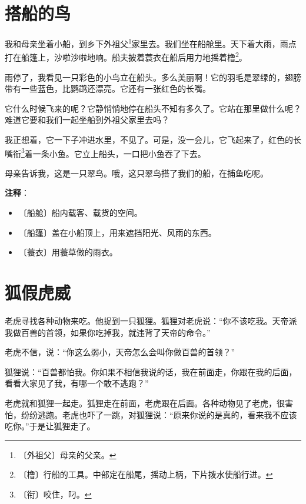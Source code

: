\documentclass[12pt,UTF-8,openany]{ctexbook}
\begin{document}
\chapter{搭船的鸟}

\begin{large}
    
    我和母亲坐着小船，到乡下外祖父\footnote{〔外祖父〕母亲的父亲。}家里去。我们坐在船舱里。天下着大雨，雨点打在船篷上，沙啦沙啦地响。船夫披着蓑衣在船后用力地摇着橹\footnote{〔橹〕行船的工具。中部定在船尾，摇动上柄，下片拨水使船行进。}。
    
    雨停了，我看见一只彩色的小鸟立在船头。多么美丽啊！它的羽毛是翠绿的，翅膀带有一些蓝色，比鹦鹉还漂亮。它还有一张红色的长嘴。
    
    它什么时候飞来的呢？它静悄悄地停在船头不知有多久了。它站在那里做什么呢？难道它要和我们一起坐船到外祖父家里去吗？
    
    我正想着，它一下子冲进水里，不见了。可是，没一会儿，它飞起来了，红色的长嘴衔\footnote{〔衔〕咬住，叼。}着一条小鱼。它立上船头，一口把小鱼吞了下去。
    
    母亲告诉我，这是一只翠鸟。哦，这只翠鸟搭了我们的船，在捕鱼吃呢。
    
\end{large}


\newpage

\textbf{注释}：

\vspace{-1em}

\begin{itemize}
    \setlength\itemsep{-0.2em}
    \item 〔船舱〕船内载客、载货的空间。
    \item 〔船篷〕盖在小船顶上，用来遮挡阳光、风雨的东西。
    \item 〔蓑衣〕用蓑草做的雨衣。
\end{itemize}

\chapter{狐假虎威}

\begin{large}
    
    老虎寻找各种动物来吃。他捉到一只狐狸。狐狸对老虎说：“你不该吃我。天帝派我做百兽的首领，如果你吃掉我，就违背了天帝的命令。”
    
    老虎不信，说：“你这么弱小，天帝怎么会叫你做百兽的首领？”
    
    狐狸说：“百兽都怕我。你如果不相信我说的话，我在前面走，你跟在我的后面，看看大家见了我，有哪一个敢不逃跑？”
    
    老虎就和狐狸一起走。狐狸走在前面，老虎跟在后面。各种动物见了老虎，很害怕，纷纷逃跑。老虎也吓了一跳，对狐狸说：“原来你说的是真的，看来我不应该吃你。”于是让狐狸走了。
    
\end{large}
\end{document}
